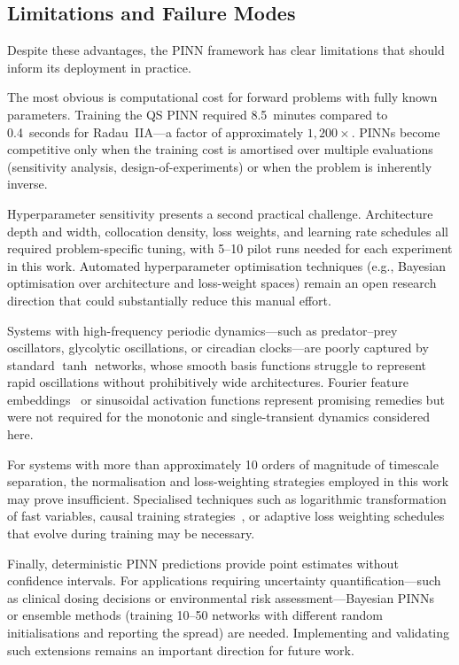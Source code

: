 \documentclass[14pt,a4paper,openany]{extbook}
\begin{document}
\subsection{Limitations and Failure Modes}
\label{subsec:limitations}

Despite these advantages, the PINN framework has clear limitations that should inform its deployment in practice.

The most obvious is computational cost for forward problems with fully known parameters. Training the QS PINN required 8.5~minutes compared to 0.4~seconds for Radau~IIA---a factor of approximately $1{,}200\times$. PINNs become competitive only when the training cost is amortised over multiple evaluations (sensitivity analysis, design-of-experiments) or when the problem is inherently inverse.

Hyperparameter sensitivity presents a second practical challenge. Architecture depth and width, collocation density, loss weights, and learning rate schedules all required problem-specific tuning, with 5--10 pilot runs needed for each experiment in this work. Automated hyperparameter optimisation techniques (e.g., Bayesian optimisation over architecture and loss-weight spaces) remain an open research direction that could substantially reduce this manual effort.

Systems with high-frequency periodic dynamics---such as predator--prey oscillators, glycolytic oscillations, or circadian clocks---are poorly captured by standard $\tanh$ networks, whose smooth basis functions struggle to represent rapid oscillations without prohibitively wide architectures. Fourier feature embeddings~\cite{tancik2020fourier} or sinusoidal activation functions represent promising remedies but were not required for the monotonic and single-transient dynamics considered here.

For systems with more than approximately 10 orders of magnitude of timescale separation, the normalisation and loss-weighting strategies employed in this work may prove insufficient. Specialised techniques such as logarithmic transformation of fast variables, causal training strategies~\cite{wang2022mathematical}, or adaptive loss weighting schedules that evolve during training may be necessary.

Finally, deterministic PINN predictions provide point estimates without confidence intervals. For applications requiring uncertainty quantification---such as clinical dosing decisions or environmental risk assessment---Bayesian PINNs~\cite{yang2021bpinn} or ensemble methods (training 10--50 networks with different random initialisations and reporting the spread) are needed. Implementing and validating such extensions remains an important direction for future work.
\end{document}
